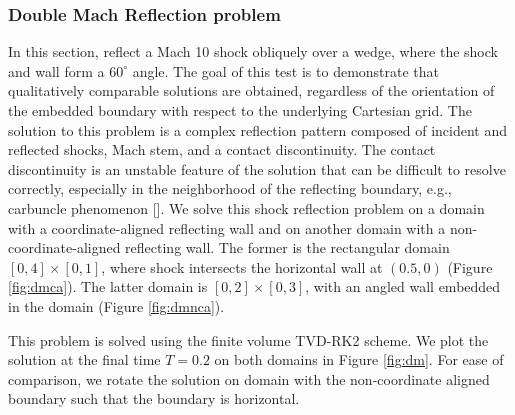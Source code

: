 \subsubsection{Double Mach Reflection problem}
In this section, reflect a Mach 10 shock obliquely over a wedge, where the shock and wall form a $60^{\circ}$ angle.  The goal of this test is to demonstrate that qualitatively comparable solutions are obtained, regardless of the orientation of the embedded boundary with respect to the underlying Cartesian grid.  The solution to this problem is a complex reflection pattern composed of incident and reflected shocks, Mach stem, and a contact discontinuity.  
The contact discontinuity is an unstable feature of the solution that can be difficult to resolve correctly, especially in the neighborhood of the reflecting boundary, e.g., carbuncle phenomenon [].
We solve this shock reflection problem on a domain with a coordinate-aligned reflecting wall and on another domain with a non-coordinate-aligned reflecting wall.
The former is the rectangular domain $[0,4] \times [0,1]$, where shock intersects the horizontal wall at $(0.5,0)$ (Figure \ref{fig:dmca}).
The latter domain is $[0,2]\times[0,3]$, with an angled wall embedded in the domain (Figure \ref{fig:dmnca}).
\begin{figure}
	\hfill
\end{figure}
This problem is solved using the finite volume TVD-RK2 scheme. 
We plot the solution at the final time $T = 0.2$ on both domains in Figure \ref{fig:dm}.  For ease of comparison, we rotate the solution on domain with the non-coordinate aligned boundary such that the boundary is horizontal.


